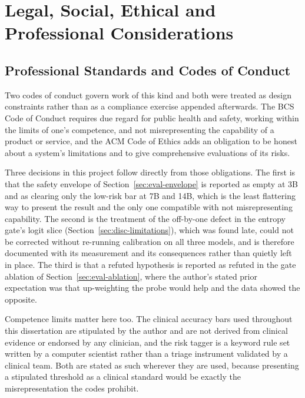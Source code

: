 \chapter{Legal, Social, Ethical and Professional Considerations}
\label{ch:lsep}

\section{Professional Standards and Codes of Conduct}
\label{sec:lsep-professional}

Two codes of conduct govern work of this kind and both were treated as design
constraints rather than as a compliance exercise appended afterwards. The BCS
Code of Conduct requires due regard for public health and safety, working
within the limits of one's competence, and not misrepresenting the capability
of a product or service, and the ACM Code of Ethics adds an obligation to be
honest about a system's limitations and to give comprehensive evaluations of
its risks.

Three decisions in this project follow directly from those obligations. The
first is that the safety envelope of Section~\ref{sec:eval-envelope} is
reported as empty at 3B and as clearing only the low-risk bar at 7B and 14B,
which is the least flattering way to present the result and the only one
compatible with not misrepresenting capability. The second is the treatment of
the off-by-one defect in the entropy gate's logit slice
(Section~\ref{sec:disc-limitations}), which was found late, could not be
corrected without re-running calibration on all three models, and is therefore
documented with its measurement and its consequences rather than quietly left
in place. The third is that a refuted hypothesis is reported as refuted in the
gate ablation of Section~\ref{sec:eval-ablation}, where the author's stated
prior expectation was that up-weighting the probe would help and the data
showed the opposite.

Competence limits matter here too. The clinical accuracy bars used throughout
this dissertation are stipulated by the author and are not derived from
clinical evidence or endorsed by any clinician, and the risk tagger is a
keyword rule set written by a computer scientist rather than a triage
instrument validated by a clinical team. Both are stated as such wherever they
are used, because presenting a stipulated threshold as a clinical standard
would be exactly the misrepresentation the codes prohibit.

